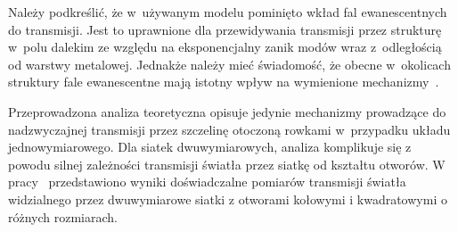 Należy podkreślić, że w~używanym modelu pominięto wkład fal ewanescentnych do transmisji. Jest to uprawnione dla przewidywania transmisji przez strukturę w~polu dalekim ze względu na eksponencjalny zanik modów wraz z~odległością od warstwy metalowej. Jednakże należy mieć świadomość, że obecne w~okolicach struktury fale ewanescentne mają istotny wpływ na wymienione mechanizmy~\cite{ebbesen1998extraordinary}.

Przeprowadzona analiza teoretyczna opisuje jedynie mechanizmy prowadzące do nadzwyczajnej transmisji przez szczelinę otoczoną rowkami w~przypadku układu jednowymiarowego. Dla siatek dwuwymiarowych, analiza komplikuje się z powodu silnej zależności transmisji światła przez siatkę od kształtu otworów. W pracy~\cite{koerkamp2004strong} przedstawiono wyniki doświadczalne pomiarów transmisji światła widzialnego przez dwuwymiarowe siatki z otworami kołowymi i kwadratowymi o różnych rozmiarach. 

